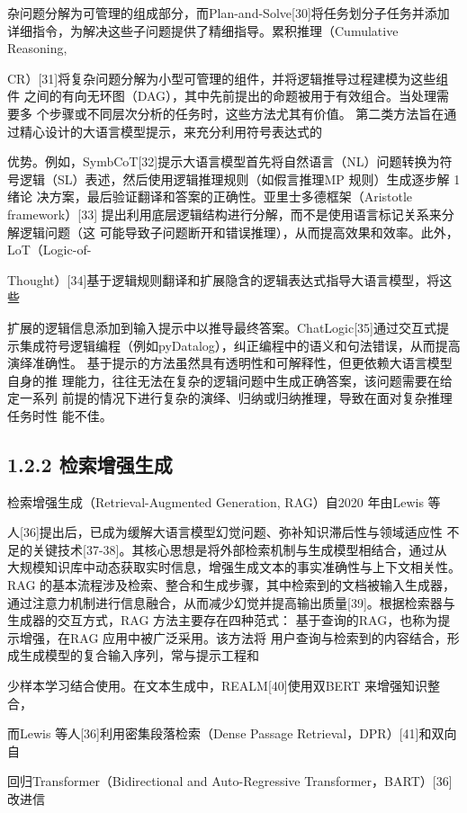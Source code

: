 \documentclass[12pt,a4paper,openright,UTF8]{ctexbook}
\begin{document}
杂问题分解为可管理的组成部分，而Plan-and-Solve[30]将任务划分子任务并添加 详细指令，为解决这些子问题提供了精细指导。累积推理（Cumulative Reasoning,

CR）[31]将复杂问题分解为小型可管理的组件，并将逻辑推导过程建模为这些组件 之间的有向无环图（DAG），其中先前提出的命题被用于有效组合。当处理需要多 个步骤或不同层次分析的任务时，这些方法尤其有价值。 第二类方法旨在通过精心设计的大语言模型提示，来充分利用符号表达式的

优势。例如，SymbCoT[32]提示大语言模型首先将自然语言（NL）问题转换为符 号逻辑（SL）表述，然后使用逻辑推理规则（如假言推理MP 规则）生成逐步解 1绪论 决方案，最后验证翻译和答案的正确性。亚里士多德框架（Aristotle framework）[33] 提出利用底层逻辑结构进行分解，而不是使用语言标记关系来分解逻辑问题（这 可能导致子问题断开和错误推理），从而提高效果和效率。此外，LoT（Logic-of-

Thought）[34]基于逻辑规则翻译和扩展隐含的逻辑表达式指导大语言模型，将这些

扩展的逻辑信息添加到输入提示中以推导最终答案。ChatLogic[35]通过交互式提 示集成符号逻辑编程（例如pyDatalog），纠正编程中的语义和句法错误，从而提高 演绎准确性。 基于提示的方法虽然具有透明性和可解释性，但更依赖大语言模型自身的推 理能力，往往无法在复杂的逻辑问题中生成正确答案，该问题需要在给定一系列 前提的情况下进行复杂的演绎、归纳或归纳推理，导致在面对复杂推理任务时性 能不佳。

\subsection{1.2.2 检索增强生成}

检索增强生成（Retrieval-Augmented Generation, RAG）自2020 年由Lewis 等

人[36]提出后，已成为缓解大语言模型幻觉问题、弥补知识滞后性与领域适应性 不足的关键技术[37-38]。其核心思想是将外部检索机制与生成模型相结合，通过从 大规模知识库中动态获取实时信息，增强生成文本的事实准确性与上下文相关性。 RAG 的基本流程涉及检索、整合和生成步骤，其中检索到的文档被输入生成器， 通过注意力机制进行信息融合，从而减少幻觉并提高输出质量[39]。根据检索器与 生成器的交互方式，RAG 方法主要存在四种范式： 基于查询的RAG，也称为提示增强，在RAG 应用中被广泛采用。该方法将 用户查询与检索到的内容结合，形成生成模型的复合输入序列，常与提示工程和

少样本学习结合使用。在文本生成中，REALM[40]使用双BERT 来增强知识整合，

而Lewis 等人[36]利用密集段落检索（Dense Passage Retrieval，DPR）[41]和双向自

回归Transformer（Bidirectional and Auto-Regressive Transformer，BART）[36]改进信
\end{document}

